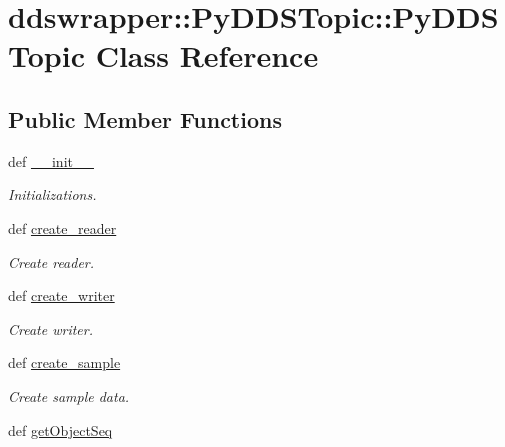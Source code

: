 \hypertarget{classddswrapper_1_1_py_d_d_s_topic_1_1_py_d_d_s_topic}{
\section{ddswrapper::PyDDSTopic::PyDDSTopic Class Reference}
\label{classddswrapper_1_1_py_d_d_s_topic_1_1_py_d_d_s_topic}
}
\subsection*{Public Member Functions}
\begin{DoxyCompactItemize}
\item 
\hypertarget{classddswrapper_1_1_py_d_d_s_topic_1_1_py_d_d_s_topic_a8138e8d28b39e4a1dd9886d0b264ef1a}{
def \hyperlink{classddswrapper_1_1_py_d_d_s_topic_1_1_py_d_d_s_topic_a8138e8d28b39e4a1dd9886d0b264ef1a}{\_\-\_\-init\_\-\_\-}}
\label{classddswrapper_1_1_py_d_d_s_topic_1_1_py_d_d_s_topic_a8138e8d28b39e4a1dd9886d0b264ef1a}

\begin{DoxyCompactList}\small\item\em Initializations. \end{DoxyCompactList}\item 
\hypertarget{classddswrapper_1_1_py_d_d_s_topic_1_1_py_d_d_s_topic_a8fa7e54acf4fd46abcc7d453ae9a9732}{
def \hyperlink{classddswrapper_1_1_py_d_d_s_topic_1_1_py_d_d_s_topic_a8fa7e54acf4fd46abcc7d453ae9a9732}{create\_\-reader}}
\label{classddswrapper_1_1_py_d_d_s_topic_1_1_py_d_d_s_topic_a8fa7e54acf4fd46abcc7d453ae9a9732}

\begin{DoxyCompactList}\small\item\em Create reader. \end{DoxyCompactList}\item 
\hypertarget{classddswrapper_1_1_py_d_d_s_topic_1_1_py_d_d_s_topic_a9213e74d8478086843655127c71bce3d}{
def \hyperlink{classddswrapper_1_1_py_d_d_s_topic_1_1_py_d_d_s_topic_a9213e74d8478086843655127c71bce3d}{create\_\-writer}}
\label{classddswrapper_1_1_py_d_d_s_topic_1_1_py_d_d_s_topic_a9213e74d8478086843655127c71bce3d}

\begin{DoxyCompactList}\small\item\em Create writer. \end{DoxyCompactList}\item 
def \hyperlink{classddswrapper_1_1_py_d_d_s_topic_1_1_py_d_d_s_topic_a05c95d5483c9bc65c1125325f57b9ed6}{create\_\-sample}
\begin{DoxyCompactList}\small\item\em Create sample data. \end{DoxyCompactList}\item 
\hypertarget{classddswrapper_1_1_py_d_d_s_topic_1_1_py_d_d_s_topic_a8319c1caa8c38643ddee8cf7a6679f78}{
def \hyperlink{classddswrapper_1_1_py_d_d_s_topic_1_1_py_d_d_s_topic_a8319c1caa8c38643ddee8cf7a6679f78}{getObjectSeq}}
\label{classddswrapper_1_1_py_d_d_s_topic_1_1_py_d_d_s_topic_a8319c1caa8c38643ddee8cf7a6679f78}


\end{DoxyCompactItemize}
